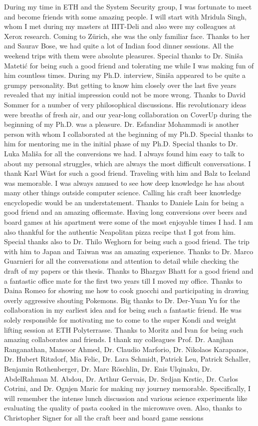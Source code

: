 During my time in ETH and the System Security group, I was fortunate to meet and become friends with some amazing people. I will start with Mridula Singh, whom I met during my masters at IIIT-Deli and also were my colleagues at Xerox research. Coming to Z\"urich, she was the only familiar face. Thanks to her and Saurav Bose, we had quite a lot of Indian food dinner sessions. All the weekend trips with them were absolute pleasures. Special thanks to Dr. Sini\v{s}a Mateti\'c for being such a good friend and tolerating me while I was making fun of him countless times. During my Ph.D. interview, Sini\v{s}a appeared to be quite a grumpy personality. But getting to know him closely over the last five years revealed that my initial impression could not be more wrong. Thanks to David Sommer for a number of very philosophical discussions. His revolutionary ideas were breaths of fresh air, and our year-long collaboration on CoverUp during the beginning of my Ph.D. was a pleasure. Dr. Esfandiar Mohammadi is another person with whom I collaborated at the beginning of my Ph.D. Special thanks to him for mentoring me in the initial phase of my Ph.D. Special thanks to Dr. Luka Mali\v{s}a for all the conversions we had. I always found him easy to talk to about my personal struggles, which are always the most difficult conversations. I thank Karl W\"ust for such a good friend. Traveling with him and Balz to Iceland was memorable. I was always amused to see how deep knowledge he has about many other things outside computer science. Calling his craft beer knowledge encyclopedic would be an understatement. Thanks to Daniele Lain for being a good friend and an amazing officemate. Having long conversions over beers and board games at his apartment were some of the most enjoyable times I had. I am also thankful for the authentic Neapolitan pizza recipe that I got from him. Special thanks also to Dr. Thilo Weghorn for being such a good friend. The trip with him to Japan and Taiwan was an amazing experience. Thanks to Dr. Marco Guarnieri for all the conversations and attention to detail while checking the draft of my papers or this thesis. Thanks to Bhargav Bhatt for a good friend and a fantastic office mate for the first two years till I moved my office. Thanks to Daina Romeo for showing me how to cook gnocchi and participating in drawing overly aggressive shouting Pokemons. Big thanks to Dr. Der-Yuan Yu for the collaboration in my earliest idea and for being such a fantastic friend. He was solely responsible for motivating me to come to the super Kondi and weight lifting session at ETH Polyterrasse. Thanks to Moritz and Ivan for being such amazing collaborates and friends. I thank my colleagues  Prof. Dr. Aanjhan Ranganathan, Mansoor Ahmed, Dr. Claudio Marforio, Dr. Nikolaos Karapanos, Dr. Hubert Ritzdorf, Mia Felic, Dr. Lara Schmidt, Patrick Leu, Patrick Schaller, Benjamin Rothenberger, Dr. Marc R\"oschlin, Dr. Enis Ulqinaku, Dr. AbdelRahman M. Abdou, Dr. Arthur Gervais, Dr. Srdjan Krstic, Dr. Carlos Cotrini, and Dr. Ognjen Maric for making my journey memorable. Specifically, I will remember the intense lunch discussion and various science experiments like evaluating the quality of pasta cooked in the microwave oven. Also, thanks to Christopher Signer for all the craft beer and board game sessions 